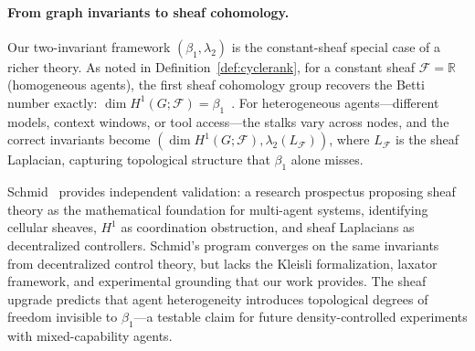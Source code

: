 \paragraph{From graph invariants to sheaf cohomology.}
Our two-invariant framework $(\beta_1, \lambda_2)$ is the
constant-sheaf special case of a richer theory.
As noted in Definition~\ref{def:cyclerank}, for a constant sheaf
$\mathcal{F} = \mathbb{R}$ (homogeneous agents), the first sheaf
cohomology group recovers the Betti number exactly:
$\dim H^1(G;\mathcal{F}) = \beta_1$~\cite{hanks2025cellular}.
For heterogeneous agents---different models, context windows, or tool
access---the stalks vary across nodes, and the correct invariants
become $(\dim H^1(G;\mathcal{F}), \lambda_2(L_{\mathcal{F}}))$,
where $L_{\mathcal{F}}$ is the sheaf Laplacian, capturing topological
structure that $\beta_1$ alone misses.

Schmid~\cite{schmid2026prospectus} provides independent validation:
a research prospectus proposing sheaf theory as the mathematical
foundation for multi-agent systems, identifying cellular sheaves,
$H^1$ as coordination obstruction, and sheaf Laplacians as
decentralized controllers.  Schmid's program converges on the same
invariants from decentralized control theory, but lacks the Kleisli
formalization, laxator framework, and experimental grounding that our
work provides.
The sheaf upgrade predicts that agent heterogeneity introduces
topological degrees of freedom invisible to $\beta_1$---a testable
claim for future density-controlled experiments with mixed-capability
agents.



%
%

